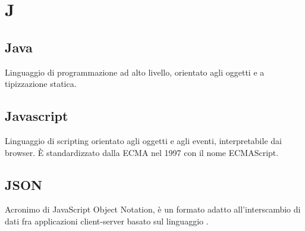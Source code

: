 \section*{J}
\markright{}

\subsection*{Java}
Linguaggio di programmazione ad alto livello, orientato agli oggetti e a tipizzazione statica.

\subsection*{Javascript}
Linguaggio di scripting orientato agli oggetti e agli eventi, interpretabile dai browser. È standardizzato dalla ECMA nel 1997 con il nome ECMAScript.

\subsection*{JSON}
Acronimo di JavaScript Object Notation, è un formato adatto all'interscambio di dati fra applicazioni client-server basato sul linguaggio .